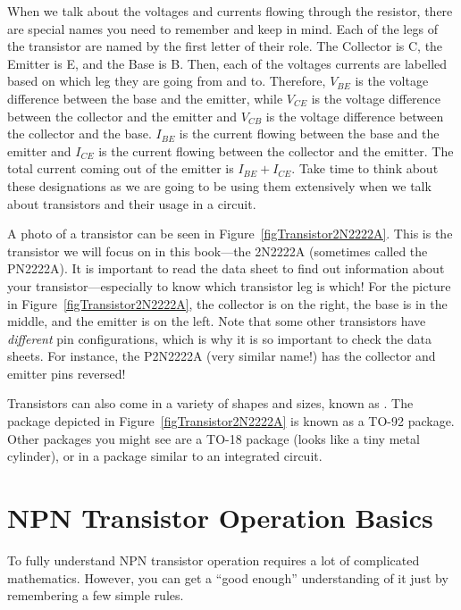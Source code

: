 
When we talk about the voltages and currents flowing through the resistor, there are special names you need to remember and keep in mind.
Each of the legs of the transistor are named by the first letter of their role.
The Collector is C, the Emitter is E, and the Base is B.
Then, each of the voltages currents are labelled based on which leg they are going from and to.
Therefore, $V_{BE}$ is the voltage difference between the base and the emitter, while $V_{CE}$ is the voltage difference between the collector and the emitter and $V_{CB}$ is the voltage difference between the collector and the base.
$I_{BE}$ is the current flowing between the base and the emitter and $I_{CE}$ is the current flowing between the collector and the emitter.
The total current coming out of the emitter is $I_{BE} + I_{CE}$.
Take time to think about these designations as we are going to be using them extensively when we talk about transistors and their usage in a circuit.


A photo of a transistor can be seen in Figure~\ref{figTransistor2N2222A}.
This is the transistor we will focus on in this book---the 2N2222A (sometimes called the PN2222A).
It is important to read the data sheet to find out information about your transistor---especially to know which transistor leg is which!
For the picture in Figure~\ref{figTransistor2N2222A}, the collector is on the right, the base is in the middle, and the emitter is on the left.
Note that some other transistors have \emph{different} pin configurations, which is why it is so important to check the data sheets.  
For instance, the P2N2222A (very similar name!) has the collector and emitter pins reversed!

Transistors can also come in a variety of shapes and sizes, known as .
The package depicted in Figure~\ref{figTransistor2N2222A} is known as a TO-92 package.
Other packages you might see are a TO-18 package (looks like a tiny metal cylinder), or in a package similar to an integrated circuit.

\section{NPN Transistor Operation Basics}

To fully understand NPN transistor operation requires a lot of complicated mathematics.
However, you can get a ``good enough'' understanding of it just by remembering a few simple rules.

